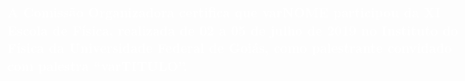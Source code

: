 \documentclass[fontsize=14pt]{scrartcl}
\begin{document}
\thispagestyle{empty}
\vspace*{7.5cm}
\hspace{7cm}
\begin{minipage}[t][7cm][t]{19cm}
\normalfont \bfseries
\textcolor{white}{A Comissão Organizadora certifica que varNOME participou da \mbox{XI} \mbox{Escola} de \mbox{Física}, realizada de 02 a 05 de julho de 2019 no Instituto do Física da Universidade Federal de Goiás, como palestrante convidado com palestra ``varTITULO''.}
\end{minipage}
\end{document}
